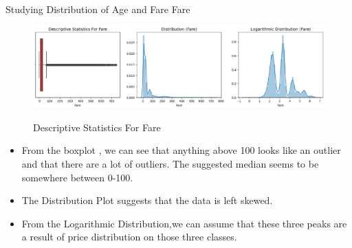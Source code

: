 \documentclass[
size=14pt,
paper=smartboard,  %
mode=present, 		%
display=slides, 	%
style=tuliplab,  	%
pauseslide,
fleqn,leqno]{powerdot}
\begin{document}
	
	\begin{slide}{Studying Distribution of Age and Fare}
		\vspace{-0.8cm}
		Fare
		\vspace{-0.8cm}
		\begin{figure}
			\centering
			\includegraphics[width=1\textwidth]{figures//fig1.eps}\\
			\caption{Descriptive Statistics For Fare}
		\end{figure}
		\vspace{-0.8cm}
		\begin{itemize}
			\item
			From the boxplot , we can see that anything above 100 looks like an outlier and that there are a lot of outliers. The suggested median seems to be somewhere between 0-100.
			\item
			The Distribution Plot suggests that the data is left skewed.
			\item 
			From the Logarithmic Distribution,we can assume that these three peaks are a result of price distribution on those three classes.
		\end{itemize}
	\end{slide}
	
\end{document}
